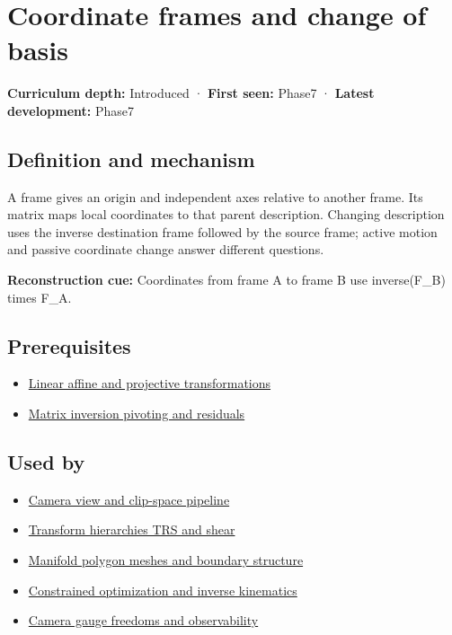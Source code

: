\hypertarget{appendix-1bae9457dbc3}{}\label{referencestart:appendix-1bae9457dbc3}
\section{Coordinate frames and change of basis}\label{appendix-1bae9457dbc3-coordinate-frames-and-change-of-basis}

\textbf{Curriculum depth:} Introduced · \textbf{First seen:} Phase7 · \textbf{Latest development:} Phase7

\subsection{Definition and mechanism}\label{appendix-1bae9457dbc3-definition-and-mechanism}

A frame gives an origin and independent axes relative to another frame. Its matrix maps local coordinates to that parent description. Changing description uses the inverse destination frame followed by the source frame; active motion and passive coordinate change answer different questions.

\textbf{Reconstruction cue:} Coordinates from frame A to frame B use inverse(F\_B) times F\_A.

\subsection{Prerequisites}\label{appendix-1bae9457dbc3-prerequisites}

\begin{itemize}
\tightlist
\item
  \hyperref[appendix-0bf0ca73f735]{Linear affine and projective transformations}
\item
  \hyperref[appendix-48d2e66378ab]{Matrix inversion pivoting and residuals}
\end{itemize}

\subsection{Used by}\label{appendix-1bae9457dbc3-used-by}

\begin{itemize}
\item
  \hyperref[appendix-1c07d64f5e70]{Camera view and clip-space pipeline}
\item
  \hyperref[appendix-292c061cd47c]{Transform hierarchies TRS and shear}
\item
  \hyperref[appendix-fab348609369]{Manifold polygon meshes and boundary structure}
\item
  \hyperref[appendix-29f4bea4c2bb]{Constrained optimization and inverse kinematics}
\item
  \hyperref[appendix-113f0267e5f4]{Camera gauge freedoms and observability}
\end{itemize}

